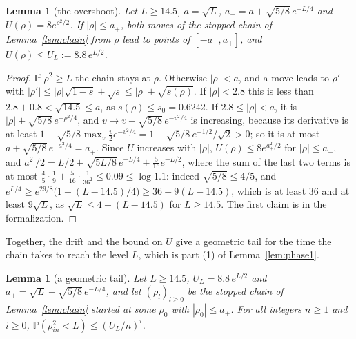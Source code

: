 \documentclass[12pt]{amsart}
\newtheorem{lemma}[theorem]{Lemma}
\theoremstyle{definition}
\numberwithin{equation}{section}
\newcommand{\Prob}{\mathbb{P}}
\newcommand{\leanmap}[1]{\ignorespaces}
\begin{document}
\begin{lemma}[the overshoot]\label{lem:overshoot}
\leanmap{RegretKappa.LowerSharp.abs_sst_le, RegretKappa.LowerSharp.abs_rhoS_le,
  RegretKappa.LowerSharp.exp_aP_sq_le, RegretKappa.LowerSharp.U_le_G}
Let $L\ge14.5$, $a=\sqrt L$, $a_+=a+\sqrt{5/8}\,e^{-L/4}$ and $U(\rho)=8e^{\rho^2/2}$. If $|\rho|\le a_+$, both moves of the stopped chain of Lemma~\ref{lem:chain} from $\rho$ lead to points of $[-a_+,a_+]$, and $U(\rho)\le U_L:=8.8\,e^{L/2}$.
\end{lemma}

\begin{proof}
If $\rho^2\ge L$ the chain stays at $\rho$. Otherwise $|\rho|<a$, and a move leads to $\rho'$ with $|\rho'|\le|\rho|\sqrt{1-s}+\sqrt s\le|\rho|+\sqrt{s(\rho)}$. If $|\rho|<2.8$ this is less than $2.8+0.8<\sqrt{14.5}\le a$, as $s(\rho)\le s_0=0.6242$. If $2.8\le|\rho|<a$, it is $|\rho|+\sqrt{5/8}\,e^{-\rho^2/4}$, and $v\mapsto v+\sqrt{5/8}\,e^{-v^2/4}$ is increasing, because its derivative is at least $1-\sqrt{5/8}\max_v\frac v2e^{-v^2/4}=1-\sqrt{5/8}\,e^{-1/2}/\sqrt2>0$; so it is at most $a+\sqrt{5/8}\,e^{-a^2/4}=a_+$. Since $U$ increases with $|\rho|$, $U(\rho)\le8e^{a_+^2/2}$ for $|\rho|\le a_+$, and $a_+^2/2=L/2+\sqrt{5L/8}\,e^{-L/4}+\frac5{16}e^{-L/2}$, where the sum of the last two terms is at most $\frac45\cdot\frac19+\frac5{16}\cdot\frac1{36^2}\le0.09\le\log1.1$: indeed $\sqrt{5/8}\le4/5$, and $e^{L/4}\ge e^{29/8}\bigl(1+(L-14.5)/4\bigr)\ge36+9(L-14.5)$, which is at least $36$ and at least $9\sqrt L$, as $\sqrt L\le4+(L-14.5)$ for $L\ge14.5$. The first claim is  in the formalization.
\end{proof}

Together, the drift and the bound on $U$ give a geometric tail for the time the chain takes to reach the level $L$, which is part (1) of Lemma~\ref{lem:phase1}.

\begin{lemma}[a geometric tail]\label{lem:FL}
\leanmap{RegretKappa.LowerSharp.ex_below_pow, RegretKappa.LowerSharp.lyap_add_mul_leS,
  RegretKappa.LowerSharp.ex_U_le, RegretKappa.LowerSharp.ex_below_pt}
Let $L\ge14.5$, $U_L=8.8\,e^{L/2}$ and $a_+=\sqrt L+\sqrt{5/8}\,e^{-L/4}$, and let $(\rho_l)_{l\ge0}$ be the stopped chain of Lemma~\ref{lem:chain} started at some $\rho_0$ with $|\rho_0|\le a_+$. For all integers $n\ge1$ and $i\ge0$, $\Prob(\rho_{in}^2<L)\le(U_L/n)^i$.
\end{lemma}
\end{document}
